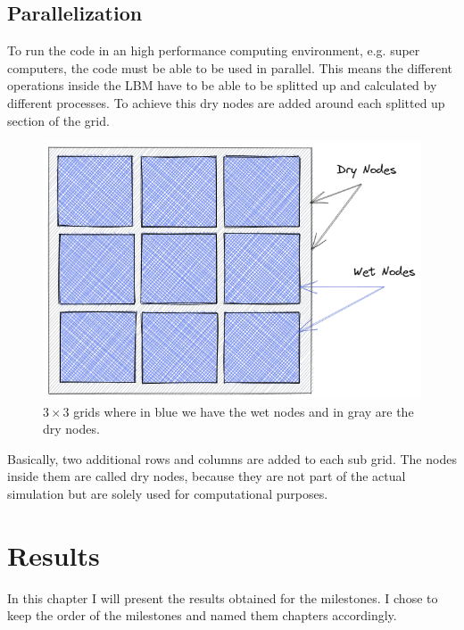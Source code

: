 \documentclass[a4paper,12pt, oneside]{book}
\begin{document}
\section{Parallelization}
To run the code in an high performance computing environment, e.g. super computers, the code must be able to be used in parallel.
This means the different operations inside the LBM have to be able to be splitted up and calculated by different processes. 
To achieve this dry nodes are added around each splitted up section of the grid.
\begin{figure}[ht]
\centering
\includegraphics[width=0.5\columnwidth]{milestones/final/img/latttice-ghost-beschriftet.png}
\caption[Wet and dry nodes]{$3\times3$ grids where in blue we have the wet nodes and in gray are the dry nodes.}
\label{fig:para-ghost}
\end{figure}
Basically, two additional rows and columns are added to each sub grid. 
The nodes inside them are called dry nodes, because they are not part of the actual simulation but are solely used for computational purposes.


\chapter{Results}
In this chapter I will present the results obtained for the milestones. I chose to keep the order of the milestones and named them chapters accordingly.
\end{document}
